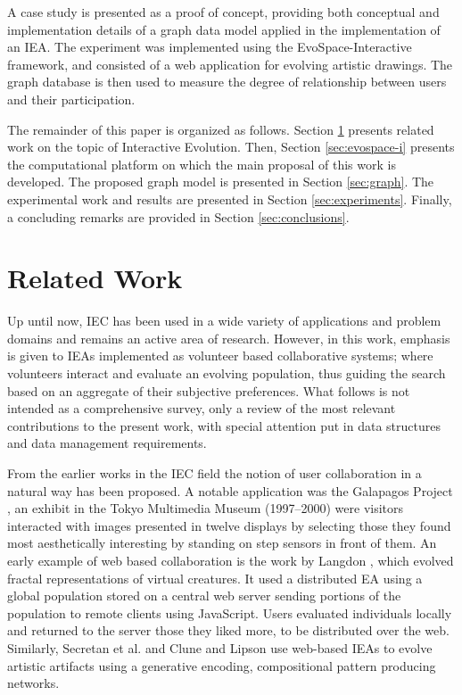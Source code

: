 \documentclass[conference]{IEEEtran}
\begin{document}
A case study is presented as a proof of concept, providing both
conceptual and implementation details of a graph data model applied in the 
implementation of an IEA. The experiment was implemented using
the EvoSpace-Interactive framework, and consisted of a web application
for evolving artistic drawings. The graph database is then used to
measure the degree of relationship between users and their participation.  

The remainder of this paper is organized as follows.
Section \ref{sec:interactive} presents related work on the topic 
of Interactive Evolution.
Then, Section \ref{sec:evospace-i} presents the computational platform on which 
the main proposal of this work is developed. The proposed graph model is 
presented in Section \ref{sec:graph}.
The experimental work and results are presented in Section \ref{sec:experiments}.
Finally, a concluding remarks are provided in Section \ref{sec:conclusions}.


\section{Related Work}
\label{sec:interactive}

Up until now, IEC  has been used in a wide variety of applications and problem domains
and remains an active area of research. However, in this work, emphasis is given to IEAs 
implemented as volunteer based collaborative systems; where volunteers interact and evaluate 
an evolving population, thus guiding the search based on an aggregate of their subjective 
preferences. What follows is not intended as a comprehensive survey, only a review of 
the most relevant contributions to the present work, with special attention put in
data structures and data management requirements.

From the earlier works in the IEC field the notion of user collaboration in a natural way
has been proposed. A notable application was the Galapagos Project \cite{sims1997interactivity},
an exhibit in the Tokyo Multimedia Museum (1997--2000) were visitors interacted with images presented in 
twelve displays by selecting those they found most aesthetically interesting by standing on
step sensors in front of them. An early example of web based collaboration is the work by 
Langdon \cite{langdon:2004}, which evolved fractal representations of virtual creatures. It used a 
distributed EA using a global population stored on a central web server sending 
portions of the population to remote clients using JavaScript. Users evaluated individuals locally 
and returned to the server those they liked more, to be distributed over the web.
Similarly, Secretan et al. \cite{picbreeder} and Clune and Lipson \cite{forms} use web-based IEAs 
to evolve artistic artifacts using a generative encoding, compositional pattern producing networks.
\end{document}
